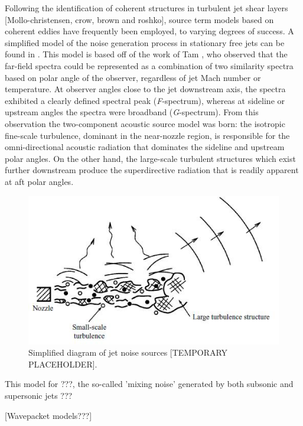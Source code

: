 Following the identification of coherent structures in turbulent jet shear layers [Mollo-christensen, crow, brown and roshko], source term models based on coherent eddies have frequently been employed, to varying degrees of success. 
A simplified model of the noise generation process in stationary free jets can be found in . 
This model is based off of the work of Tam \etal \citep{Tam1996, Tam2008}, who observed that the far-field spectra could be represented as a combination of two similarity spectra based on polar angle of the observer, regardless of jet Mach number or temperature.
At observer angles close to the jet downstream axis, the spectra exhibited a clearly defined spectral peak (\emph{F}-spectrum), whereas at sideline or upstream angles the spectra were broadband (\emph{G}-spectrum).
From this observation the two-component acoustic source model was born: the isotropic fine-scale turbulence, dominant in the near-nozzle region, is responsible for the omni-directional acoustic radiation that dominates the sideline and upstream polar angles. 
On the other hand, the large-scale turbulent structures which exist further downstream produce the superdirective radiation that is readily apparent at aft polar angles. 
\begin{figure}
	\centering
	\includegraphics[width=5in]{Figures/JetNoiseSourceDiagramTMP.jpg}
	\caption{Simplified diagram of jet noise sources [TEMPORARY PLACEHOLDER].}
	\label{fig:jet_sources_diagram}
\end{figure}

This model for ???, the so-called 'mixing noise' generated by both subsonic and supersonic jets ???

[Wavepacket models???]
 
